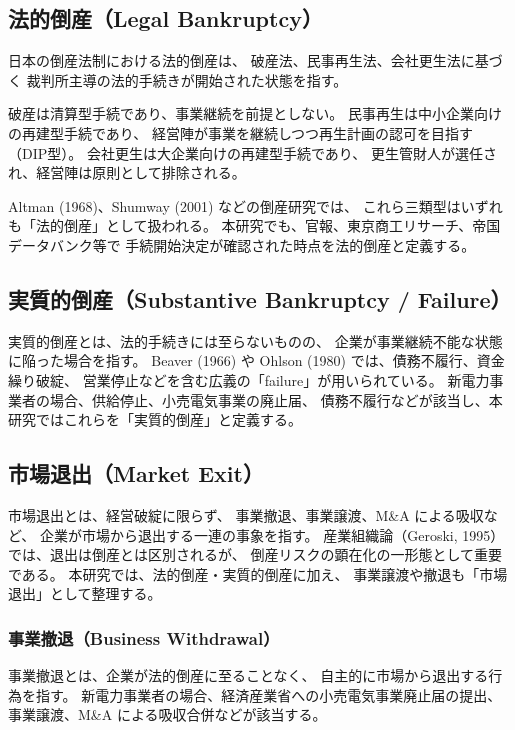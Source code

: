 \subsection{法的倒産（Legal Bankruptcy）}

日本の倒産法制における法的倒産は、
破産法、民事再生法、会社更生法に基づく
裁判所主導の法的手続きが開始された状態を指す。

破産は清算型手続であり、事業継続を前提としない。
民事再生は中小企業向けの再建型手続であり、
経営陣が事業を継続しつつ再生計画の認可を目指す（DIP型）。
会社更生は大企業向けの再建型手続であり、
更生管財人が選任され、経営陣は原則として排除される。

Altman (1968)、Shumway (2001) などの倒産研究では、
これら三類型はいずれも「法的倒産」として扱われる。
本研究でも、官報、東京商工リサーチ、帝国データバンク等で
手続開始決定が確認された時点を法的倒産と定義する。


\subsection{実質的倒産（Substantive Bankruptcy / Failure）}

実質的倒産とは、法的手続きには至らないものの、
企業が事業継続不能な状態に陥った場合を指す。
Beaver (1966) や Ohlson (1980) では、債務不履行、資金繰り破綻、
営業停止などを含む広義の「failure」が用いられている。
新電力事業者の場合、供給停止、小売電気事業の廃止届、
債務不履行などが該当し、本研究ではこれらを「実質的倒産」と定義する。

\subsection{市場退出（Market Exit）}

市場退出とは、経営破綻に限らず、
事業撤退、事業譲渡、M\&A による吸収など、
企業が市場から退出する一連の事象を指す。
産業組織論（Geroski, 1995）では、退出は倒産とは区別されるが、
倒産リスクの顕在化の一形態として重要である。
本研究では、法的倒産・実質的倒産に加え、
事業譲渡や撤退も「市場退出」として整理する。

\subsubsection{事業撤退（Business Withdrawal）}

事業撤退とは、企業が法的倒産に至ることなく、
自主的に市場から退出する行為を指す。
新電力事業者の場合、経済産業省への小売電気事業廃止届の提出、
事業譲渡、M\&A による吸収合併などが該当する。

